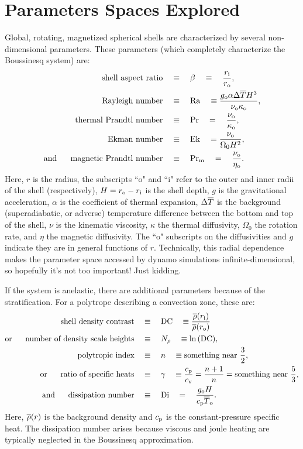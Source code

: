\documentclass[12pt]{article} %
\begin{document}
\section{Parameters  Spaces Explored}
Global, rotating, magnetized spherical shells are characterized by several non-dimensional parameters. These parameters (which completely characterize the Boussinesq system) are:
\begin{align}
	\text{shell aspect ratio}\quad & \equiv\quad \beta \quad  \equiv\quad  \frac{r_{\rm{i}}}{r_{\rm{o}}},\\
	\text{Rayleigh number} \quad & \equiv \quad {\rm{Ra}} \quad \equiv \frac{g_{\rm{o}}\alpha\Delta\overline{T} H^3}{\nu_{\rm{o}}\kappa_{\rm{o}}},\\
	\text{thermal Prandtl number} \quad & \equiv \quad {\rm{Pr}} \quad = \quad \frac{\nu_{\rm{o}}}{\kappa_{\rm{o}}},\\
	\text{Ekman number}\quad & \equiv \quad {\rm{Ek}} \quad = \frac{\nu_{\rm{o}}}{\Omega_0H^2},\\
	\text{and}\ \ \ \ \ \text{magnetic Prandtl number} \quad & \equiv \quad {\rm{Pr_m}} \quad = \quad \frac{\nu_{\rm{o}}}{\eta_{\rm{o}}}.
\end{align}
Here, $r$ is the radius, the subscripts ``o" and ``i" refer to the outer and inner radii of the shell (respectively), $H=r_{\rm{o}}-r_{\rm{i}}$ is the shell depth, $g$ is the gravitational acceleration, $\alpha$ is the coefficient of thermal expansion, $\Delta\overline{T}$ is the background (superadiabatic, or adverse) temperature difference between the bottom and top of the shell, $\nu$ is the kinematic viscosity, $\kappa$ the thermal diffusivity, $\Omega_0$ the rotation rate, and $\eta$ the magnetic diffusivity. The ``o" subscripts on the diffusivities and $g$ indicate they are in general functions of $r$. Technically, this radial dependence makes the parameter space accessed by dynamo simulations infinite-dimensional, so hopefully it's not too important! Just kidding.

If the system is anelastic, there are additional parameters because of the stratification. For a polytrope describing a convection zone, these are:
\begin{align}
	\text{shell density contrast}\quad & \equiv \quad {\rm{DC}} \quad \equiv \frac{\overline{\rho}(r_{\rm{i}})}{\overline{\rho}(r_{\rm{o}})}\\
	\text{or}\ \ \ \ \  \text{number of density scale heights}\quad &  \equiv \quad N_\rho \quad \equiv \ln{(\rm{DC})}, \\ 
	\text{polytropic index} \quad & \equiv \quad n \quad \equiv \text{something near}\  \frac{3}{2},\\
	\text{or}\ \ \ \ \  	\text{ratio of specific heats} \quad & \equiv \quad \gamma \quad \equiv \frac{c_{\rm{p}}}{c_{\rm{v}}}=\frac{n+1}{n}=\text{something near}\  \frac{5}{3},\\
	\text{and}\ \ \ \ \  \text{dissipation number} \quad & \equiv\quad {\rm{Di}}\quad = \quad \frac{g_{\rm{o}} H}{c_{\rm{p}} \overline{T}_{\rm{o}}}.
\end{align}
Here, $\overline{\rho}(r)$ is the background density and $c_{\rm{p}}$ is the constant-pressure specific heat. The dissipation number arises because viscous and joule heating are typically neglected in the Boussinesq approximation. 
\end{document}
